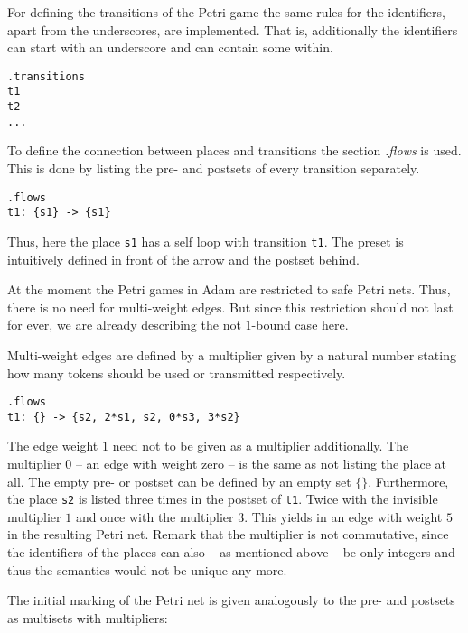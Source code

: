 \documentclass[runningheads]{./llncs/llncs}
\newcommand{\tool}{{\sc Adam}}
\begin{document}
For defining the transitions of the Petri game the same rules for the identifiers, apart from the underscores, are implemented. That is, additionally the identifiers can start with an underscore and can contain some within.

\begin{lstlisting}[language=apt-format]
.transitions
t1
t2
...
\end{lstlisting}

To define the connection between places and transitions the section \textit{.flows} is used. This is done by listing the pre- and postsets of every transition separately.

\begin{lstlisting}[language=apt-format]
.flows
t1: {s1} -> {s1}
\end{lstlisting}

Thus, here the place \texttt{s1} has a self loop with transition \texttt{t1}. The preset is intuitively defined in front of the arrow and the postset behind.

At the moment the Petri games in \tool{} are restricted to safe Petri nets. Thus, there is no need for multi-weight edges. But since this restriction should not last for ever, we are already describing the not $1$-bound case here. 

Multi-weight edges are defined by a multiplier given by a natural number stating how many tokens should be used or transmitted respectively.

\begin{lstlisting}[language=apt-format]
.flows
t1: {} -> {s2, 2*s1, s2, 0*s3, 3*s2} 
\end{lstlisting}

The edge weight $1$ need not to be given as a multiplier additionally. The multiplier $0$ -- an edge with weight zero -- is the same as not listing the place at all. The empty pre- or postset can be defined by an empty set $\{\}$. Furthermore, the place \texttt{s2} is listed three times in the postset of \texttt{t1}. Twice with the invisible multiplier $1$ and once with the multiplier $3$. This yields in an edge with weight $5$ in the resulting Petri net. Remark that the multiplier is not commutative, since the identifiers of the places can also -- as mentioned above -- be only integers and thus the semantics would not be unique any more.  

The initial marking of the Petri net is given analogously to the pre- and postsets as multisets with multipliers:
\end{document}
